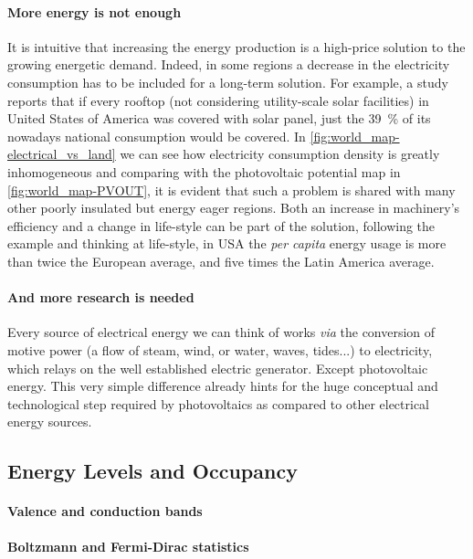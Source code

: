 	\paragraph{More energy is not enough} It is intuitive that increasing the energy production is a high-price solution to the growing energetic demand.
	Indeed, in some regions a decrease in the electricity consumption has to be included for a long-term solution.
	For example, a study\cite{Margolis2016} reports that if every rooftop (not considering utility-scale solar facilities) in United States of America was covered with solar panel, just the 39~\% of its nowadays national consumption would be covered.
	In \cref{fig:world_map-electrical_vs_land} we can see how electricity consumption density is greatly inhomogeneous and comparing with the photovoltaic potential map in \cref{fig:world_map-PVOUT}, it is evident that such a problem is shared with many other poorly insulated but energy eager regions.
	Both an increase in machinery's efficiency and a change in life-style can be part of the solution, following the example and thinking at life-style, in USA the \textsl{per capita} energy usage is more than twice the European average, and five times the Latin America average.\cite{IEA}

	\paragraph{And more research is needed} Every source of electrical energy we can think of works \textsl{via} the conversion of motive power (a flow of steam, wind, or water, waves, tides...) to electricity, which relays on the well established electric generator.
	Except photovoltaic energy.
	This very simple difference already hints for the huge conceptual and technological step required by photovoltaics as compared to other electrical energy sources.


	\subsection{Energy Levels and Occupancy}

		\paragraph{Valence and conduction bands}

		\paragraph{Boltzmann and Fermi-Dirac statistics}

